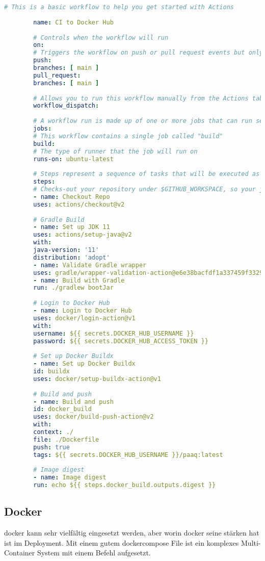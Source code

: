 \documentclass[../main.tex]{subfiles}
\begin{document}
	\begin{lstlisting}[language=yaml]
		# This is a basic workflow to help you get started with Actions
		
		name: CI to Docker Hub
		
		# Controls when the workflow will run
		on:
		# Triggers the workflow on push or pull request events but only for the main branch
		push:
		branches: [ main ]
		pull_request:
		branches: [ main ]
		
		# Allows you to run this workflow manually from the Actions tab
		workflow_dispatch:
		
		# A workflow run is made up of one or more jobs that can run sequentially or in parallel
		jobs:
		# This workflow contains a single job called "build"
		build:
		# The type of runner that the job will run on
		runs-on: ubuntu-latest
		
		# Steps represent a sequence of tasks that will be executed as part of the job
		steps:
		# Checks-out your repository under $GITHUB_WORKSPACE, so your job can access it
		- name: Checkout Repo
		uses: actions/checkout@v2
		
		# Gradle Build
		- name: Set up JDK 11
		uses: actions/setup-java@v2
		with:
		java-version: '11'
		distribution: 'adopt'
		- name: Validate Gradle wrapper
		uses: gradle/wrapper-validation-action@e6e38bacfdf1a337459f332974bb2327a31aaf4b
		- name: Build with Gradle
		run: ./gradlew bootJar
		
		# Login to Docker Hub
		- name: Login to Docker Hub
		uses: docker/login-action@v1
		with:
		username: ${{ secrets.DOCKER_HUB_USERNAME }}
		password: ${{ secrets.DOCKER_HUB_ACCESS_TOKEN }}
		
		# Set up Docker Buildx
		- name: Set up Docker Buildx
		id: buildx
		uses: docker/setup-buildx-action@v1
		
		# Build and push
		- name: Build and push
		id: docker_build
		uses: docker/build-push-action@v2
		with:
		context: ./
		file: ./Dockerfile
		push: true
		tags: ${{ secrets.DOCKER_HUB_USERNAME }}/paaq:latest
		
		# Image digest
		- name: Image digest
		run: echo ${{ steps.docker_build.outputs.digest }}
	\end{lstlisting}
	
	\subsection{Docker}
	\gls{docker} kann sehr vielfältig eingesetzt werden, aber worin \gls{docker} seine stärken hat ist im Deployment. Mit einem gutem \gls{dockercompose} File ist ein komplexes Multi-Container System mit einem Befehl aufgesetzt.
	
\end{document}
